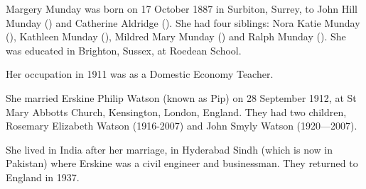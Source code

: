 
Margery Munday was born on 17 October 1887 in	Surbiton, Surrey, to John Hill Munday () and Catherine Aldridge (). She had four siblings: Nora Katie Munday (), Kathleen Munday (), Mildred Mary Munday () and Ralph Munday ().
She was educated in Brighton, Sussex, at Roedean School.

Her occupation in 1911 was as a Domestic Economy Teacher. \cite{MMundayOccupation}

She married Erskine Philip Watson (known as Pip) on 28 September 1912, at St Mary Abbotts Church, Kensington, London, England.  They had two children, Rosemary Elizabeth Watson (1916-2007) and John Smyly Watson (1920---2007).

She lived in India after her marriage, in Hyderabad Sindh (which is now in Pakistan)  where Erskine was a civil engineer and businessman.  They returned to England in 1937.

